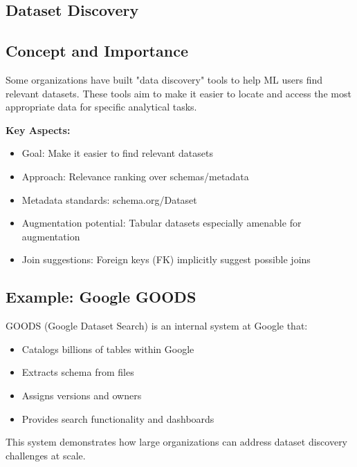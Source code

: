 \documentclass[12pt]{article}
\begin{document}
\subsection{Dataset Discovery}

\subsection{Concept and Importance}
\begin{tcolorbox}[colback=yellow!5!white,colframe=yellow!75!black,title={Dataset Discovery}]
Some organizations have built "data discovery" tools to help ML users find relevant datasets. These tools aim to make it easier to locate and access the most appropriate data for specific analytical tasks.

\textbf{Key Aspects:}
\begin{itemize}
    \item Goal: Make it easier to find relevant datasets
    \item Approach: Relevance ranking over schemas/metadata
    \item Metadata standards: schema.org/Dataset
    \item Augmentation potential: Tabular datasets especially amenable for augmentation
    \item Join suggestions: Foreign keys (FK) implicitly suggest possible joins
\end{itemize}
\end{tcolorbox}

\subsection{Example: Google GOODS}
\begin{tcolorbox}[colback=blue!5!white,colframe=blue!75!black,title={Example: Google GOODS}]
GOODS (Google Dataset Search) is an internal system at Google that:
\begin{itemize}
    \item Catalogs billions of tables within Google
    \item Extracts schema from files
    \item Assigns versions and owners
    \item Provides search functionality and dashboards
\end{itemize}
This system demonstrates how large organizations can address dataset discovery challenges at scale.
\end{tcolorbox}
\end{document}
